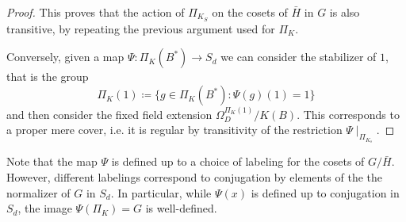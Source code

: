 \documentclass[10pt]{amsart}
\theoremstyle{definition}
\begin{document}
\begin{proof}
This proves that the action of $\Pi_{K_S}$ on the cosets of $\bar{H}$ in $G$ is also transitive, by repeating the previous argument used for $\Pi_K$. 
  

Conversely, given a map $\Psi\colon \Pi_K(B^*) \rightarrow S_d$ we can consider the stabilizer of $1$, that is the group 
\begin{equation}
\label{eq:defP}
\Pi_K(1)\coloneqq \{ g\in \Pi_K(B^*): \Psi(g)(1)=1\}
\end{equation}
and then consider the fixed field extension $\Omega_D^{\Pi_K(1)}/K(B)$. This corresponds to a proper mere cover, i.e. it is regular by transitivity of the restriction $\Psi \!\! \mid_{\Pi_{K_s}}$.
\end{proof}

Note that the map $\Psi$ is defined up to a choice of labeling for the cosets of $G/\bar{H}$. However, different labelings  correspond to conjugation by elements of the the normalizer of $G$ in $S_d$. In particular, while $\Psi(x)$ is defined up to conjugation in $S_d$, the image $\Psi(\Pi_K) = G$ is well-defined.
\end{document}
